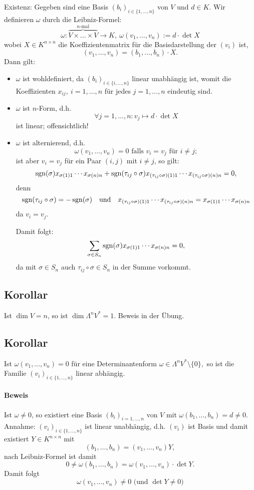 	Existenz: Gegeben sind eine Basis $ (b_i)_{i\in \{1,\dots, n\}} $ von $ V $ und $ d\in K $. Wir definieren $ \omega $ durch die Leibniz-Formel:
		\[ \omega: \overbrace{V\times \dots \times V}^{n\text{-mal}} \to K,\ \omega(v_1,\dots,v_n):=d\cdot\det X \]
	wobei $ X\in K^{n\times n} $ die Koeffizientenmatrix für die Basisdarstellung der $ (v_i) $ ist,
		\[ (v_1,\dots,v_n)=(b_1,\dots,b_n)\cdot X. \]
	Dann gilt:
		\begin{itemize}
			\item $ \omega $ ist wohldefiniert, da $ (b_i)_{i\in \{i,\dots,n\}} $ linear unabhängig ist, womit die Koeffizienten $ x_{ij},\ i=1,\dots,n $ für jedes $ j=1,\dots,n $ eindeutig sind.
			\item $ \omega $ ist $ n $-Form, d.h.
				\[ \forall j=1,\dots,n: v_j\mapsto d\cdot\det X\]
			ist linear; offensichtlich!
			\item $ \omega $ ist alternierend, d.h.
				\[ \omega(v_1,\dots,v_n)=0\text{ falls } v_i = v_j \text{ für }i\neq j; \]
			ist aber $ v_i = v_j $ für ein Paar $ (i,j) $ mit $ i\neq j $, so gilt:
				\[ \operatorname{sgn}(\sigma)x_{\sigma(1)1}\cdots x_{\sigma(n)n} + \operatorname{sgn}(\tau_{ij}\circ \sigma) x_{(\tau_{ij}\circ \sigma)(1)1}\cdots x_{(\tau_{ij}\circ \sigma)(n)n} = 0,  \]
			denn
				\[ \operatorname{sgn}(\tau_{ij}\circ \sigma) = -\operatorname{sgn}(\sigma) \quad\text{und}\quad x_{(\tau_{ij}\circ\sigma)(1)1}\cdots x_{(\tau_{ij}\circ\sigma)(n)n} = x_{\sigma(1)1}\cdots x_{\sigma(n)n} \]
			da $ v_i = v_j $.
			
			Damit folgt:
				\[ \sum_{\sigma\in S_n}\operatorname{sgn}(\sigma)x_{\sigma(1)1}\cdots x_{\sigma(n)n}=0, \]
			da mit $ \sigma\in S_n $ auch $ \tau_{ij}\circ\sigma\in S_n $ in der Summe vorkommt.
		\end{itemize}	
\subsection{Korollar}
	\begin{Korollar}
		Ist $ \dim V = n $, so ist $ \dim\Lambda^nV^* = 1 $. Beweis in der Übung.
	\end{Korollar}
\subsection{Korollar}
	Ist $ \omega(v_1,\dots,v_n)=0 $ für eine Determinantenform $ \omega\in\Lambda^nV^*\setminus\{0\}, $ so ist die Familie $ (v_i)_{i\in \{1,\dots, n\}} $ linear abhängig.
\paragraph{Beweis}
	Ist $ \omega\neq 0 $, so existiert eine Basis $ (b_i)_{i=1,\dots,n} $ von $ V $ mit $ \omega(b_1,\dots,b_n)=d\neq 0 $. 
	Annahme: $ (v_i)_{i\in \{1,\dots,n\}} $ ist linear unabhängig, d.h. $ (v_i) $ ist Basis und damit existiert $ Y\in K^{n\times n} $ mit
		\[ (b_1,\dots,b_n)=(v_1,\dots,v_n)Y, \]
	nach Leibniz-Formel ist damit
		\[ 0\neq \omega(b_1,\dots,b_n)=\omega(v_1,\dots,v_n)\cdot \det Y. \]
	Damit folgt
		\[ \omega(v_1,\dots,v_n)\neq 0 \text{ (und }\det Y \neq 0) \]


